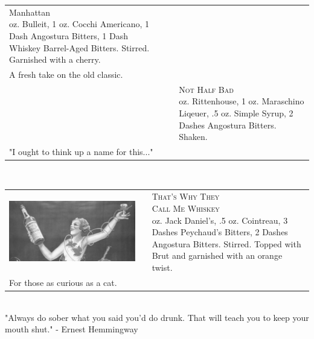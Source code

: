 \documentclass{article}
\makeatletter
\newcommand \Dotfill {\leavevmode \cleaders \hb@xt@ .25em{\hss .\hss }\hfill \kern \z@}%
\makeatother
\begin{document}
{\begin{tabular}{m{}m{}m{}}
{\centering\Huge{Manhattan}\\*}
\centering 2 oz. Bulleit, 1 oz. Cocchi Americano, 1 Dash Angostura Bitters, 1 Dash Whiskey Barrel-Aged Bitters. Stirred. Garnished with a cherry.\\
\centering\small{A fresh take on the old classic.}\\
&
&
{\centering\Huge\textsc{Not Half Bad}\\*}
\centering 2 oz. Rittenhouse, 1 oz. Maraschino Liqeuer, .5 oz. Simple Syrup, 2 Dashes Angostura Bitters. Shaken. \\
\centering\small{"I ought to think up a name for this..."}
\end{tabular}\\[-4pt]
\makebox[\columnwidth]{\Huge\Dotfill}

\begin{tabular}{m{}m{}m{}}
\includegraphics[scale=.39]{kina.png}
&
&
{\centering\Huge\textsc{That's Why They\\[-10pt] Call Me Whiskey}\\*}
\centering 1 oz. Jack Daniel's, .5 oz. Cointreau, 3 Dashes Peychaud's Bitters, 2 Dashes Angostura Bitters. Stirred. Topped with Brut and garnished with an orange twist.\\
\centering\small{For those as curious as a cat.}
\end{tabular}
\makebox[\columnwidth]{\Huge\Dotfill}\\[-3pt]
{\small "Always do sober what you said you'd do drunk. That will teach you to keep your mouth shut." - Ernest Hemmingway}\\[-5pt]
\makebox[\columnwidth]{\Huge\Dotfill}\\


}
\end{document}

